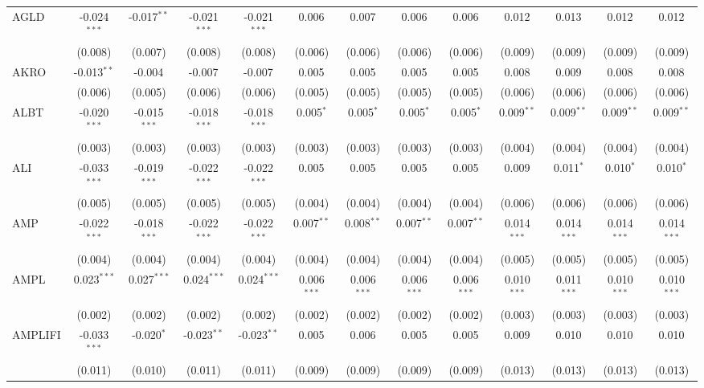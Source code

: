\begin{table}[!htbp]
\begin{tabular}{@{\extracolsep{5pt}}lcccccccccccc}
 AGLD & -0.024$^{***}$ & -0.017$^{**}$ & -0.021$^{***}$ & -0.021$^{***}$ & 0.006$^{}$ & 0.007$^{}$ & 0.006$^{}$ & 0.006$^{}$ & 0.012$^{}$ & 0.013$^{}$ & 0.012$^{}$ & 0.012$^{}$ \\
  & (0.008) & (0.007) & (0.008) & (0.008) & (0.006) & (0.006) & (0.006) & (0.006) & (0.009) & (0.009) & (0.009) & (0.009) \\
 AKRO & -0.013$^{**}$ & -0.004$^{}$ & -0.007$^{}$ & -0.007$^{}$ & 0.005$^{}$ & 0.005$^{}$ & 0.005$^{}$ & 0.005$^{}$ & 0.008$^{}$ & 0.009$^{}$ & 0.008$^{}$ & 0.008$^{}$ \\
  & (0.006) & (0.005) & (0.006) & (0.006) & (0.005) & (0.005) & (0.005) & (0.005) & (0.006) & (0.006) & (0.006) & (0.006) \\
 ALBT & -0.020$^{***}$ & -0.015$^{***}$ & -0.018$^{***}$ & -0.018$^{***}$ & 0.005$^{*}$ & 0.005$^{*}$ & 0.005$^{*}$ & 0.005$^{*}$ & 0.009$^{**}$ & 0.009$^{**}$ & 0.009$^{**}$ & 0.009$^{**}$ \\
  & (0.003) & (0.003) & (0.003) & (0.003) & (0.003) & (0.003) & (0.003) & (0.003) & (0.004) & (0.004) & (0.004) & (0.004) \\
 ALI & -0.033$^{***}$ & -0.019$^{***}$ & -0.022$^{***}$ & -0.022$^{***}$ & 0.005$^{}$ & 0.005$^{}$ & 0.005$^{}$ & 0.005$^{}$ & 0.009$^{}$ & 0.011$^{*}$ & 0.010$^{*}$ & 0.010$^{*}$ \\
  & (0.005) & (0.005) & (0.005) & (0.005) & (0.004) & (0.004) & (0.004) & (0.004) & (0.006) & (0.006) & (0.006) & (0.006) \\
 AMP & -0.022$^{***}$ & -0.018$^{***}$ & -0.022$^{***}$ & -0.022$^{***}$ & 0.007$^{**}$ & 0.008$^{**}$ & 0.007$^{**}$ & 0.007$^{**}$ & 0.014$^{***}$ & 0.014$^{***}$ & 0.014$^{***}$ & 0.014$^{***}$ \\
  & (0.004) & (0.004) & (0.004) & (0.004) & (0.004) & (0.004) & (0.004) & (0.004) & (0.005) & (0.005) & (0.005) & (0.005) \\
 AMPL & 0.023$^{***}$ & 0.027$^{***}$ & 0.024$^{***}$ & 0.024$^{***}$ & 0.006$^{***}$ & 0.006$^{***}$ & 0.006$^{***}$ & 0.006$^{***}$ & 0.010$^{***}$ & 0.011$^{***}$ & 0.010$^{***}$ & 0.010$^{***}$ \\
  & (0.002) & (0.002) & (0.002) & (0.002) & (0.002) & (0.002) & (0.002) & (0.002) & (0.003) & (0.003) & (0.003) & (0.003) \\
 AMPLIFI & -0.033$^{***}$ & -0.020$^{*}$ & -0.023$^{**}$ & -0.023$^{**}$ & 0.005$^{}$ & 0.006$^{}$ & 0.005$^{}$ & 0.005$^{}$ & 0.009$^{}$ & 0.010$^{}$ & 0.010$^{}$ & 0.010$^{}$ \\
  & (0.011) & (0.010) & (0.011) & (0.011) & (0.009) & (0.009) & (0.009) & (0.009) & (0.013) & (0.013) & (0.013) & (0.013) \\

\end{tabular}
\end{table}
